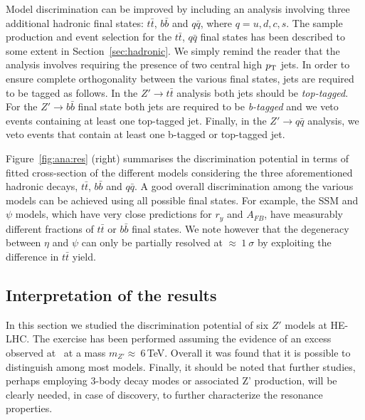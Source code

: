 Model discrimination can be improved by including an analysis involving three additional hadronic final states: $t\bar{t}$, $b\bar{b}$ and $q\bar{q}$, where $q=u,d,c,s$. The sample production and event selection for the $t\bar{t}$, $q\bar{q}$ final states has been described to some extent in Section~\ref{sec:hadronic}. We simply remind the reader that the analysis involves requiring the presence of two central high $p_{\text{T}}$ jets. In order to ensure complete orthogonality between the various final states, jets are required to be tagged as follows. In the $Z' \rightarrow t\bar{t}$ analysis both jets should be \emph{top-tagged}. For the $Z' \rightarrow b\bar{b}$ final state both jets are required to be \emph{b-tagged} and we veto events containing at least one top-tagged jet. Finally, in the $Z' \rightarrow q\bar{q}$ analysis, we veto events that contain at least one b-tagged or top-tagged jet.

Figure~\ref{fig:ana:res} (right) summarises the discrimination potential in terms of fitted cross-section of the different models considering the three aforementioned hadronic decays, $t\bar{t}$,  $b\bar{b}$ and $q\bar{q}$. A good overall discrimination among the various models can be achieved using all possible final states. For example, the SSM and $\psi$ models, which have very close predictions for $r_y$ and $A_{FB}$, have measurably different fractions of $t\bar{t}$ or $b\bar{b}$ final states. We note however that the degeneracy between $\eta$ and $\psi$ can only be partially resolved at $\approx~1~\sigma$ by exploiting the difference in $t\bar{t}$ yield.

\subsection{Interpretation of the results}
In this section we studied the discrimination potential of six $Z'$ models at HE-LHC. The exercise has been performed assuming the evidence of an excess observed at \sqrtslhc\ at a mass $m_{Z'}\approx~6$\,TeV. Overall it was found that it is possible to distinguish among most models. Finally, it should be noted that further studies, perhaps employing 3-body decay modes or associated Z' production, will be clearly needed, in case of discovery, to further characterize the resonance properties.



